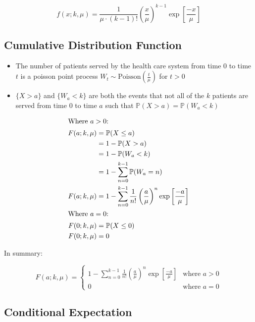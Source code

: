 \documentclass{article}
\begin{document}
\begin{equation*}
	f (x; k, \mu) = \frac{1}{\mu \cdot (k - 1)!} \left( \frac{x}{\mu} \right)^{k - 1} \exp \left[ \frac{-x}{\mu} \right]
\end{equation*}

\subsection{Cumulative Distribution Function}

\begin{itemize}
	\item The number of patients served by the health care system from time 0 to time $t$ is a poisson point process $W_{t} \sim \text{Poisson} \left( \frac{t}{\mu} \right)$ for $t > 0$
	\item $\{ X > a \}$ and $\{ W_{a} < k \}$ are both the events that not all of the $k$ patients are served from time 0 to time $a$ such that $\mathbb{P} (X > a) = \mathbb{P} (W_{a} < k)$
\end{itemize}

\begin{align*}
	\intertext{Where $a > 0$:}
	F (a; k, \mu) & = \mathbb{P} (X \leq a) \\
	& = 1 - \mathbb{P} (X > a) \\
	& = 1 - \mathbb{P} (W_{a} < k) \\
	& = 1 - \sum_{n = 0}^{k - 1} \mathbb{P} (W_{a} = n) \\
	F (a; k, \mu) & = 1 - \sum_{n = 0}^{k - 1} \frac{1}{n!} \left( \frac{a}{\mu} \right)^{n} \exp \left[ \frac{-a}{\mu} \right] \\
	\intertext{Where $a = 0$:}
	F (0; k, \mu) & = \mathbb{P} (X \leq 0) \\
	F (0; k, \mu) & = 0 \\
\end{align*}

In summary:

\begin{equation}
	F (a; k, \mu) = \begin{cases} 1 - \sum_{n = 0}^{k - 1} \frac{1}{n!} \left( \frac{a}{\mu} \right)^{n} \exp \left[ 
						\frac{-a}{\mu} \right] & \text{where $a > 0$} \\
						0 & \text{where $a = 0$} \end{cases}
\end{equation}

\subsection{Conditional Expectation}
\end{document}
